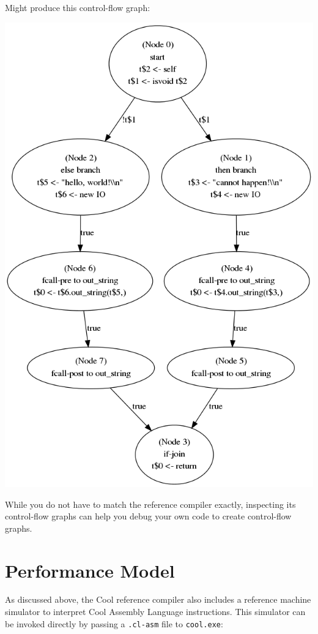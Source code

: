 \documentclass[]{article}
\begin{document}
Might produce this control-flow graph:

\includegraphics{cfg-example.png}

While you do not have to match the reference compiler exactly,
inspecting its control-flow graphs can help you debug your own code to
create control-flow graphs.

\section{Performance Model}

As discussed above, the Cool reference compiler also includes a
reference machine simulator to interpret Cool Assembly Language
instructions. This simulator can be invoked directly by passing a
\texttt{.cl-asm} file to \texttt{cool.exe}:
\end{document}
